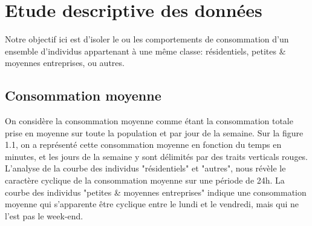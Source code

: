 \documentclass[11pt,fleqn]{book} %
\begin{document}
\section{Etude descriptive des données}

Notre objectif ici est d'isoler le ou les comportements de consommation d'un ensemble d'individus appartenant à une même classe: résidentiels, petites \& moyennes entreprises, ou autres. 

\subsection{Consommation moyenne}
On considère la consommation moyenne comme étant la consommation totale prise en moyenne sur toute la population et par jour de la semaine. Sur la figure 1.1, on a représenté cette consommation moyenne en fonction du temps en minutes, et les jours de la semaine y sont délimités par des traits verticals rouges. 
L'analyse de la courbe des individus "résidentiels" et "autres", nous révèle le caractère cyclique de la consommation moyenne sur une période de 24h. La courbe des individus "petites \& moyennes entreprises" indique une consommation moyenne qui s'apparente être cyclique entre le lundi et le vendredi, mais qui ne l'est pas le week-end.





\printbibliography


\end{document}
